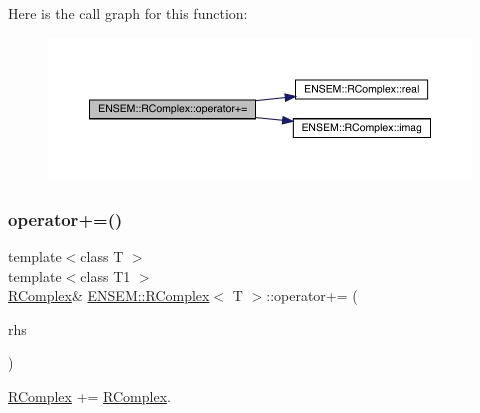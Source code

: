 Here is the call graph for this function\+:
\nopagebreak
\begin{figure}[H]
\begin{center}
\leavevmode
\includegraphics[width=350pt]{d9/d0e/classENSEM_1_1RComplex_aca53957ad00d064844898e907e6f6fab_cgraph}
\end{center}
\end{figure}
\mbox{\label{classENSEM_1_1RComplex_aca53957ad00d064844898e907e6f6fab}} 
\subsubsection{\texorpdfstring{operator+=()}{operator+=()}\hspace{0.1cm}{\footnotesize\ttfamily [5/6]}}
{\footnotesize\ttfamily template$<$class T $>$ \\
template$<$class T1 $>$ \\
\mbox{\hyperlink{classENSEM_1_1RComplex}{R\+Complex}}\& \mbox{\hyperlink{classENSEM_1_1RComplex}{E\+N\+S\+E\+M\+::\+R\+Complex}}$<$ T $>$\+::operator+= (\begin{DoxyParamCaption}\item[{const \mbox{\hyperlink{classENSEM_1_1RComplex}{R\+Complex}}$<$ T1 $>$ \&}]{rhs }\end{DoxyParamCaption})\hspace{0.3cm}{\ttfamily [inline]}}



\mbox{\hyperlink{classENSEM_1_1RComplex}{R\+Complex}} += \mbox{\hyperlink{classENSEM_1_1RComplex}{R\+Complex}}. 

